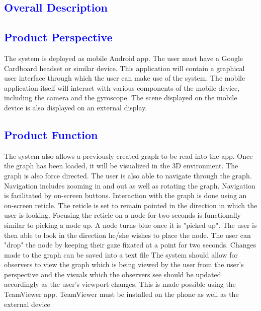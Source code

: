 \documentclass[12pt]{article}
\begin{document}
\textcolor{blue}{\section{Overall Description}}
\textcolor{blue}{\subsection{Product Perspective}}
\begin{flushleft}
The system is deployed as mobile Android app. The user must have a Google Cardboard headset or similar device. This application will contain a graphical user interface through which the user can make use of the system. The mobile application itself will interact with various components of the mobile device, including the camera and the gyroscope. The scene displayed on the mobile device is also displayed on an external display. 
\end{flushleft}

\textcolor{blue}{\subsection{Product Function}}
\begin{flushleft}
The system also allows a previously created graph to be read into the app. Once the graph has been loaded, it will be visualized in the 3D environment. The graph is also force directed. The user is also able to navigate through the graph. Navigation includes zooming in and out as well as rotating the graph. Navigation is facilitated by on-screen buttons. Interaction with the graph is done using an on-screen reticle. The reticle is set to remain pointed in the direction in which the user is looking. Focusing the reticle on a node for two seconds is functionally similar to picking a node up. A node turns blue once it is "picked up". The user is then able to look in the direction he/she wishes to place the node. The user can "drop" the node by keeping their gaze fixated at a point for two seconds. Changes made to the graph can be saved into a text file The system should allow for observers to view the graph which is being viewed by the user from the user’s perspective and the visuals which the observers see should be updated accordingly as the user’s viewport changes. This is made possible using the TeamViewer app. TeamViewer must be installed on the phone as well as the external device
\end{flushleft}
\end{document}
